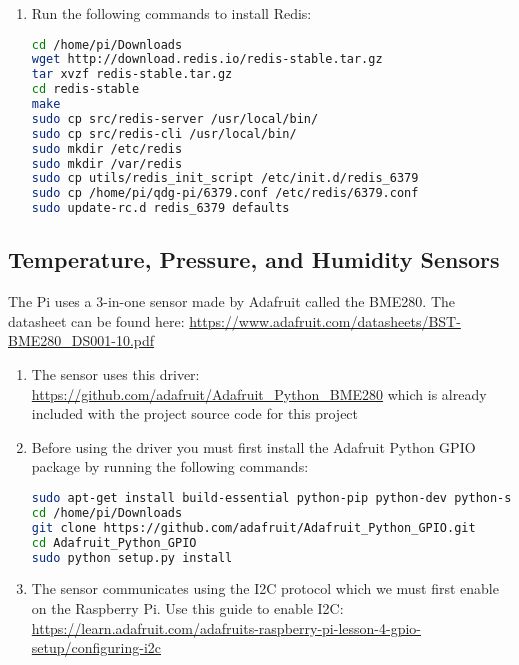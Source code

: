 \documentclass[a4paper,12pt]{article}
\begin{document}
\begin{enumerate}

\item Run the following commands to install Redis:
\begin{lstlisting}[language=bash, mathescape]
cd /home/pi/Downloads
wget http://download.redis.io/redis-stable.tar.gz
tar xvzf redis-stable.tar.gz
cd redis-stable
make
sudo cp src/redis-server /usr/local/bin/
sudo cp src/redis-cli /usr/local/bin/
sudo mkdir /etc/redis
sudo mkdir /var/redis
sudo cp utils/redis_init_script /etc/init.d/redis_6379
sudo cp /home/pi/qdg-pi/6379.conf /etc/redis/6379.conf
sudo update-rc.d redis_6379 defaults
\end{lstlisting}

\end{enumerate}

\subsection{Temperature, Pressure, and Humidity Sensors}

The Pi uses a 3-in-one sensor made by Adafruit called the BME280. The datasheet can be found here: \href{https://www.adafruit.com/datasheets/BST-BME280\_DS001-10.pdf}{https://www.adafruit.com/datasheets/BST-BME280\_DS001-10.pdf}

\begin{enumerate}

\item The sensor uses this driver: \href{https://github.com/adafruit/Adafruit\_Python\_BME280}{https://github.com/adafruit/Adafruit\_Python\_BME280} which is already included with the project source code for this project
\item Before using the driver you must first install the Adafruit Python GPIO package by running the following commands:

\begin{lstlisting}[language=bash]
sudo apt-get install build-essential python-pip python-dev python-smbus git
cd /home/pi/Downloads
git clone https://github.com/adafruit/Adafruit_Python_GPIO.git
cd Adafruit_Python_GPIO
sudo python setup.py install
\end{lstlisting}

\item The sensor communicates using the I2C protocol which we must first enable on the Raspberry Pi. Use this guide to enable I2C: \href{https://learn.adafruit.com/adafruits-raspberry-pi-lesson-4-gpio-setup/configuring-i2c}{https://learn.adafruit.com/adafruits-raspberry-pi-lesson-4-gpio-setup/configuring-i2c}

\end{enumerate}
\end{document}
